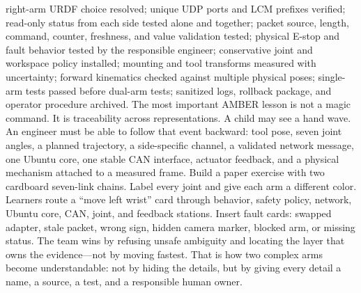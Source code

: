 \markdownRendererUlItem \markdownRendererUntickedBox{} right-arm URDF choice resolved;\markdownRendererUlItemEnd 
\markdownRendererUlItem \markdownRendererUntickedBox{} unique UDP ports and LCM prefixes verified;\markdownRendererUlItemEnd 
\markdownRendererUlItem \markdownRendererUntickedBox{} read-only status from each side tested alone and together;\markdownRendererUlItemEnd 
\markdownRendererUlItem \markdownRendererUntickedBox{} packet source, length, command, counter, freshness, and value validation tested;\markdownRendererUlItemEnd 
\markdownRendererUlItem \markdownRendererUntickedBox{} physical E-stop and fault behavior tested by the responsible engineer;\markdownRendererUlItemEnd 
\markdownRendererUlItem \markdownRendererUntickedBox{} conservative joint and workspace policy installed;\markdownRendererUlItemEnd 
\markdownRendererUlItem \markdownRendererUntickedBox{} mounting and tool transforms measured with uncertainty;\markdownRendererUlItemEnd 
\markdownRendererUlItem \markdownRendererUntickedBox{} forward kinematics checked against multiple physical poses;\markdownRendererUlItemEnd 
\markdownRendererUlItem \markdownRendererUntickedBox{} single-arm tests passed before dual-arm tests;\markdownRendererUlItemEnd 
\markdownRendererUlItem \markdownRendererUntickedBox{} sanitized logs, rollback package, and operator procedure archived.\markdownRendererUlItemEnd 
\markdownRendererUlEnd \markdownRendererInterblockSeparator
{}
\markdownRendererSectionEnd \markdownRendererSectionBegin
{}\markdownRendererInterblockSeparator
{}The most important AMBER lesson is not a magic command. It is traceability across representations. A child may see a hand wave. An engineer must be able to follow that event backward: tool pose, seven joint angles, a planned trajectory, a side-specific channel, a validated network message, one Ubuntu core, one stable CAN interface, actuator feedback, and a physical mechanism attached to a measured frame.\markdownRendererParagraphSeparator
{}Build a paper exercise with two cardboard seven-link chains. Label every joint and give each arm a different color. Learners route a “move left wrist” card through behavior, safety policy, network, Ubuntu core, CAN, joint, and feedback stations. Insert fault cards: swapped adapter, stale packet, wrong sign, hidden camera marker, blocked arm, or missing status. The team wins by refusing unsafe ambiguity and locating the layer that owns the evidence—not by moving fastest.\markdownRendererParagraphSeparator
{}That is how two complex arms become understandable: not by hiding the details, but by giving every detail a name, a source, a test, and a responsible human owner.
\markdownRendererSectionEnd \markdownRendererDocumentEnd